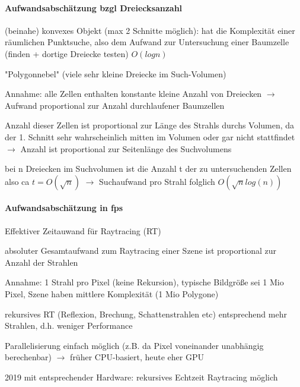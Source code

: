 \documentclass[landscape]{article}
\begin{document}
\begin{multicols}{3}
  \paragraph{Aufwandsabschätzung bzgl Dreiecksanzahl}
  \begin{enumerate*}
    \item (beinahe) konvexes Objekt (max 2 Schnitte möglich): hat die Komplexität einer räumlichen Punktsuche, also dem Aufwand zur Untersuchung einer Baumzelle (finden + dortige Dreiecke testen) $O(log n)$
    \item "Polygonnebel" (viele sehr kleine Dreiecke im Such-Volumen)
          \begin{itemize*}
            \item Annahme: alle Zellen enthalten konstante kleine Anzahl von Dreiecken $\rightarrow$ Aufwand proportional zur Anzahl durchlaufener Baumzellen
            \item Anzahl dieser Zellen ist proportional zur Länge des Strahls durchs Volumen, da der 1. Schnitt sehr wahrscheinlich mitten im Volumen oder gar nicht stattfindet $\rightarrow$ Anzahl ist proportional zur Seitenlänge des Suchvolumens
            \item bei n Dreiecken im Suchvolumen ist die Anzahl t der zu untersuchenden Zellen also ca $t=O(\sqrt{n})$ $\rightarrow$ Suchaufwand pro Strahl folglich $O(\sqrt{n} log (n))$
          \end{itemize*}
  \end{enumerate*}
  
  \paragraph{Aufwandsabschätzung in fps}
  \begin{itemize*}
    \item Effektiver Zeitauwand für Raytracing (RT)
    \item absoluter Gesamtaufwand zum Raytracing einer Szene ist proportional zur Anzahl der Strahlen
    \item Annahme: 1 Strahl pro Pixel (keine Rekursion), typische Bildgröße sei 1 Mio Pixel, Szene haben mittlere Komplexität (1 Mio Polygone)
    \item rekursives RT (Reflexion, Brechung, Schattenstrahlen etc) entsprechend mehr Strahlen, d.h. weniger Performance
    \item Parallelisierung einfach möglich (z.B. da Pixel voneinander unabhängig berechenbar) $\rightarrow$ früher CPU-basiert, heute eher GPU
    \item 2019 mit entsprechender Hardware: rekursives Echtzeit Raytracing möglich
  \end{itemize*}
  

\end{multicols}
\end{document}
